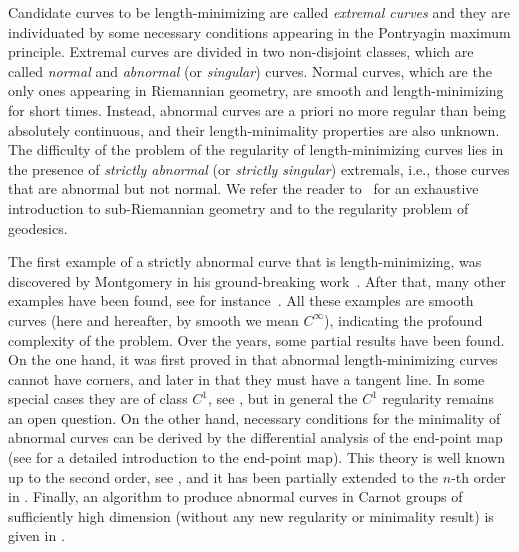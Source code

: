 \documentclass[12pt]{amsart}
\theoremstyle{plain}
\theoremstyle{definition}
\theoremstyle{remark}
\numberwithin{equation}{section}
\newcommand{\oo}{\infty}
\newcommand{\<}{\langle}
\renewcommand{\>}{\rangle}
\newcommand{\0}{\theta}
\newcommand{\1}{{-1}}
\renewcommand{\=}{\coloneqq}
\renewcommand{\.}{\dots}
\renewcommand{\-}{\cdot}
\renewcommand{\:}{\,:\,}
\theoremstyle{definition}
\begin{document}
Candidate curves to be length-minimizing are called {\em extremal curves} and they are individuated by some necessary conditions appearing in the Pontryagin maximum principle. Extremal curves are divided in two non-disjoint classes, which are called {\em normal} and {\em abnormal} (or {\em singular}) curves. Normal curves, which are the only ones appearing in Riemannian geometry, are smooth and length-minimizing for short times. Instead, abnormal curves are a priori no more regular than being absolutely continuous, and their length-minimality properties are also unknown. The difficulty of the problem of the regularity of length-minimizing curves lies in the presence of {\em strictly abnormal} (or {\em strictly singular}) extremals, i.e., those curves that are abnormal but not normal. We refer the reader to~\cite{ABB20,AgrSac,J14,Mon02,Rif14} for an exhaustive introduction to sub-Riemannian geometry and to the regularity problem of geodesics.


The first example of a strictly abnormal curve that is length-minimizing, was discovered by Montgomery in his ground-breaking work~\cite{Mon94}. After that, many other examples have been found, see for instance~\cite{AS96, LS95}. All these examples are smooth curves (here and hereafter, by smooth we mean $C^\oo$), indicating the profound complexity of the problem. Over the years, some partial results have been found. On the one hand, it was first proved in \cite{HL16, LM08} that abnormal length-minimizing curves cannot have corners, and later in \cite{HL23, MPV18} that they must have a tangent line. In some special cases they are of class $C^1$, see \cite{BCJPS20, BFPR22, LPS24}, but in general the $C^1$ regularity remains an open question. On the other hand, necessary conditions for the minimality of abnormal curves can be derived by the differential analysis of the end-point map (see \cite[Chapter 8]{ABB20} for a detailed introduction to the end-point map). This theory is well known up to the second order, see \cite{AgrSac, Goh66}, and it has been partially extended to the $n$-th order in \cite{BMS24}. Finally, an algorithm to produce abnormal curves in Carnot groups of sufficiently high dimension (without any new regularity or minimality result) is given in \cite{H20}.
\end{document}
